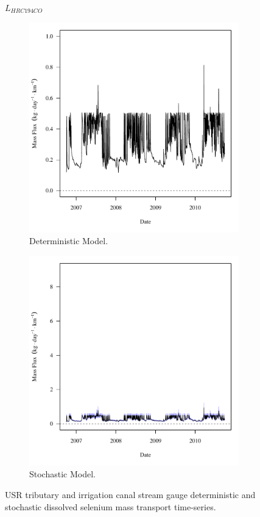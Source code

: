 \subfiguremid
\begin{landscape}
	\begin{figure}
		$ \displaystyle L_{HRC194CO} $
		\begin{subfigure}{0.7\textwidth}
			\centering
			\includegraphics[width=\tableCustomSize]{"Figures/Results_USR/Deterministic/f HRC"}
			\caption{Deterministic Model.}
		\end{subfigure}%
		\begin{subfigure}{0.7\textwidth}
			\centering
			\includegraphics[width=\tableCustomSize]{"Figures/Results_USR/Stochastic/f HRC"}
			\caption{Stochastic Model.}
		\end{subfigure}
		\caption{USR tributary and irrigation canal stream gauge deterministic and stochastic dissolved selenium mass transport time-series.}
	\end{figure}
\end{landscape}
